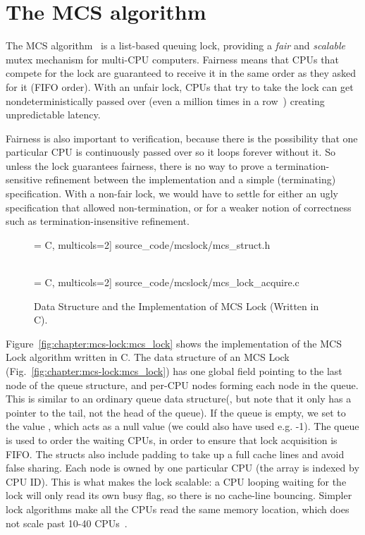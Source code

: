 \section{The MCS algorithm}
\label{sec:overview}

The MCS algorithm~\cite{mcs91} is a list-based queuing lock,
providing a \emph{fair} and \emph{scalable} mutex mechanism for
multi-CPU computers. Fairness means that
CPUs that compete for the lock are guaranteed to receive it in the same
order as they asked for it (FIFO order). With an unfair lock, CPUs
that try to take the lock can get nondeterministically passed over
(even a million times in a row~\cite{lwn:ticketlocks}) creating
unpredictable latency.

Fairness is also important to verification, because
there is the possibility that one particular CPU is continuously
passed over so it loops forever without it.
So unless the lock
guarantees fairness, there is no way to prove a termination-sensitive
refinement between the implementation and a simple (terminating)
specification. With a non-fair lock, we would have to settle for
either an ugly specification that allowed non-termination, or for a
weaker notion of correctness such as termination-insensitive
refinement.

\begin{figure}
\begin{minipage}{\linewidth}
 = C, multicols=2] {source_code/mcslock/mcs_struct.h}
\end{minipage}
\\

 = C, multicols=2] {source_code/mcslock/mcs_lock_acquire.c}
\caption{Data Structure and the Implementation of MCS Lock (Written in C).}
\label{fig:chapter:mcslock:mcs_lock}
\end{figure}

Figure~\ref{fig:chapter:mcs-lock:mcs_lock} shows the implementation of the MCS Lock algorithm written in C. 
The data structure of an MCS Lock (Fig.~\ref{fig:chapter:mcs-lock:mcs_lock}) has
one global field pointing to the last node of the queue structure, and
per-CPU nodes forming each node in the queue. This is similar to an
ordinary queue data structure(, but note that it only has a
pointer to the tail, not the head of the queue).  If the queue is
empty, we set  to the value , which
acts as a null value (we could also have used e.g. -1). The queue is
used to order the waiting CPUs, in order to ensure that lock
acquisition is FIFO. The structs also include padding to take up a
full cache lines and avoid false sharing.  Each node is owned by one
particular CPU (the array is indexed by CPU ID).  This is what makes
the lock scalable: a CPU looping waiting for the lock will only read
its own busy flag, so there is no cache-line bouncing. Simpler lock
algorithms make all the CPUs read the same memory location, which does
not scale past 10-40 CPUs~\cite{Boyd-wickizer12}.

